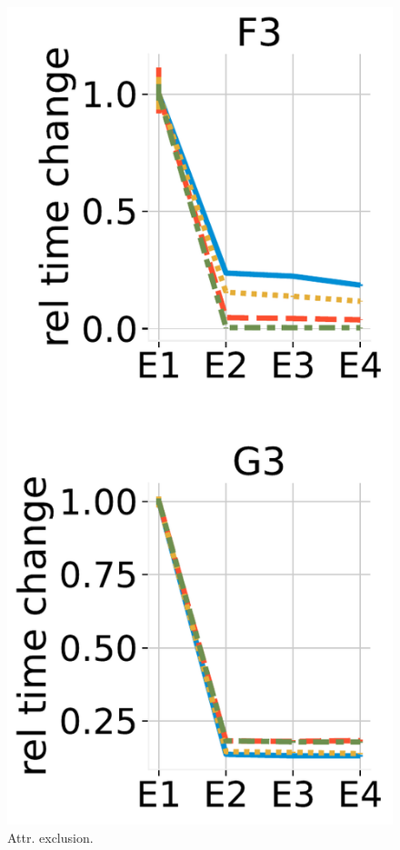 \begin{figure}
\begin{minipage}[c]{0.23\textwidth}
		\includegraphics[scale=0.24]{img/exclude.pdf}
		\vspace{-1em}
		\caption{Attr. exclusion.}
		\label{fig:exclude}
	\end{minipage}
	\begin{minipage}[c]{0.23\textwidth}

\end{minipage}
\end{figure}
